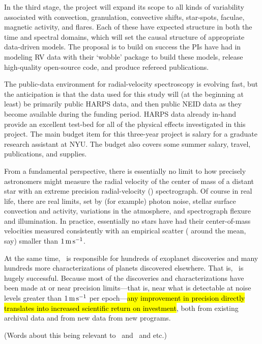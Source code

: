 \documentclass[12pt, letterpaper]{article}
\begin{document}
In the third stage, the project will expand its scope to all kinds of
variability associated with convection, granulation, convective
shifts, star-spots, faculae, magnetic activity, and flares. Each of
these have expected structure in both the time and spectral domains,
which will set the causal structure of appropriate data-driven
models. The proposal is to build on success the PIs have had in
modeling RV data with their ‘wobble’ package to build these models,
release high-quality open-source code, and produce refereed
publications.

The public-data environment for radial-velocity spectroscopy is
evolving fast, but the anticipation is that the data used for this
study will (at the beginning at least) be primarily public HARPS data,
and then public NEID data as they become available during the funding
period. HARPS data already in-hand provide an excellent test-bed for
all of the physical effects investigated in this project. The main
budget item for this three-year project is salary for a graduate
research assistant at NYU. The budget also covers some summer salary,
travel, publications, and supplies.


\noindent
From a fundamental perspective, there is essentially no limit to how
precisely astronomers might measure the radial velocity of the center of mass
of a distant star with an extreme precision radial-velocity (\EPRV) spectrograph.
Of course in real life, there are real limits, set
by (for example) photon noise, stellar surface convection and activity,
variations in the atmosphere, and spectrograph flexure and illumination. In practice,
essentially no stars have had their center-of-mass velocities measured
consistently with an empirical scatter ( around the mean,
say) smaller than $1\,{\mathrm{m\,s^{-1}}}$.

At the same time, \EPRV\ is responsible for hundreds of 
exoplanet discoveries and many hundreds more 
characterizations of planets
discovered elsewhere. That is, \EPRV\ is hugely successful.
Because most of the discoveries and characterizations have been made
at or near precision limits---that is, near what is detectable at noise levels
greater than $1\,{\mathrm{m\,s^{-1}}}$ per epoch---\hl{any improvement in precision directly
translates into increased scientific return on investment},
both from existing archival data and from new data from new programs.

(Words about this being relevant to \NASA\ and \XRP\ and etc.)
\end{document}
